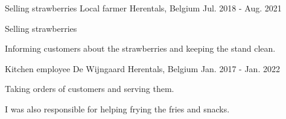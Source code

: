\begin{cventries}
  \cventry
    {Selling strawberries} %
    {Local farmer} %
    {Herentals, Belgium} %
    {Jul. 2018 - Aug. 2021} %
    {
      \begin{cvitems} %
        \item {Selling strawberries}
        \item {Informing customers about the strawberries and keeping the stand clean.}
      \end{cvitems}
    }

  \cventry
    {Kitchen employee} %
    {De Wijngaard} %
    {Herentals, Belgium} %
    {Jan. 2017 - Jan. 2022} %
    {
      \begin{cvitems} %
        \item {Taking orders of customers and serving them.}
        \item {I was also responsible for helping frying the fries and snacks.}
      \end{cvitems}
    }

\end{cventries}
